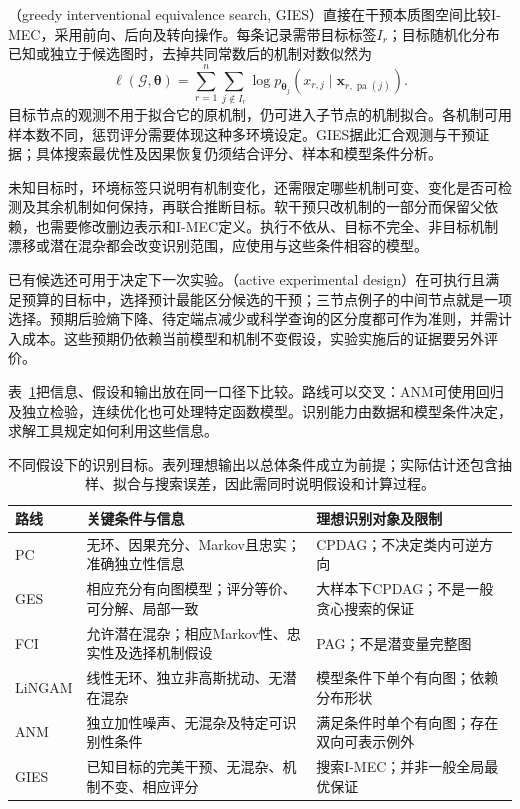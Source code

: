 （greedy interventional equivalence search, GIES）直接在干预本质图空间比较I-MEC，采用前向、后向及转向操作。每条记录需带目标标签$I_r$；目标随机化分布已知或独立于候选图时，去掉共同常数后的机制对数似然为
\[
  \ell(\mathcal{G},\bm{\theta})
  =\sum_{r=1}^{n}\sum_{j\notin I_r}
       \log p_{\bm{\theta}_j}
          (x_{r,j}\mid\bm{x}_{r,\operatorname{pa}(j)}).
\]
目标节点的观测不用于拟合它的原机制，仍可进入子节点的机制拟合。各机制可用样本数不同，惩罚评分需要体现这种多环境设定。GIES据此汇合观测与干预证据；具体搜索最优性及因果恢复仍须结合评分、样本和模型条件分析。

未知目标时，环境标签只说明有机制变化，还需限定哪些机制可变、变化是否可检测及其余机制如何保持，再联合推断目标。软干预只改机制的一部分而保留父依赖，也需要修改删边表示和I-MEC定义。执行不依从、目标不完全、非目标机制漂移或潜在混杂都会改变识别范围，应使用与这些条件相容的模型。

已有候选还可用于决定下一次实验。（active experimental design）在可执行且满足预算的目标中，选择预计最能区分候选的干预；三节点例子的中间节点就是一项选择。预期后验熵下降、待定端点减少或科学查询的区分度都可作为准则，并需计入成本。这些预期仍依赖当前模型和机制不变假设，实验实施后的证据要另外评价。

表~\ref{tab:pgm-structure-learning-causal-routes}把信息、假设和输出放在同一口径下比较。路线可以交叉：ANM可使用回归及独立检验，连续优化也可处理特定函数模型。识别能力由数据和模型条件决定，求解工具规定如何利用这些信息。

\begin{table}[htbp]
  \centering
  \small
  \begin{tabularx}{\linewidth}{@{}lXX@{}}
    \toprule
    路线 & 关键条件与信息 & 理想识别对象及限制 \\
    \midrule
    PC & 无环、因果充分、Markov且忠实；准确独立性信息 & CPDAG；不决定类内可逆方向 \\
    GES & 相应充分有向图模型；评分等价、可分解、局部一致 & 大样本下CPDAG；不是一般贪心搜索的保证 \\
    FCI & 允许潜在混杂；相应Markov性、忠实性及选择机制假设 & PAG；不是潜变量完整图 \\
    LiNGAM & 线性无环、独立非高斯扰动、无潜在混杂 & 模型条件下单个有向图；依赖分布形状 \\
    ANM & 独立加性噪声、无混杂及特定可识别性条件 & 满足条件时单个有向图；存在双向可表示例外 \\
    GIES & 已知目标的完美干预、无混杂、机制不变、相应评分 & 搜索I-MEC；并非一般全局最优保证 \\
    \bottomrule
  \end{tabularx}
  \caption{不同假设下的识别目标。表列理想输出以总体条件成立为前提；实际估计还包含抽样、拟合与搜索误差，因此需同时说明假设和计算过程。}
  \label{tab:pgm-structure-learning-causal-routes}
\end{table}

